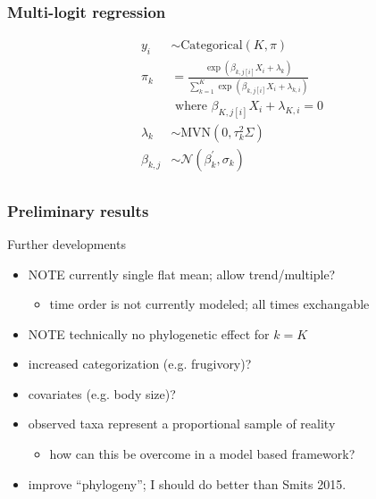 \documentclass{beamer}
\begin{document}
\begin{frame}
  \frametitle{Multi-logit regression}
  \begin{equation*}
    \begin{aligned}
      y_{i} &\sim \mathrm{Categorical}(K, \pi) \\
      \pi_{k} &= \frac{\exp(\beta_{k, j[i]} X_{i} + \lambda_{k})}{\sum_{k = 1}^{K} \exp(\beta_{k, j[i]} X_{i} + \lambda_{k, i})} \\ 
      &\text{ where } \beta_{K, j[i]} X_{i} + \lambda_{K, i} = 0 \\
      \lambda_{k} &\sim \mathrm{MVN}(0, \tau_{k}^{2}\Sigma) \\
      \beta_{k, j} &\sim \mathcal{N}(\beta_{k}^{\prime}, \sigma_{k}) \\
    \end{aligned}
  \end{equation*}
\end{frame}

\begin{frame}
  \frametitle{Preliminary results}
\end{frame}

\begin{frame}
  \begin{block}{Further developments}
    \begin{itemize}
      \item \uppercase{\alert{note}} currently single flat mean; allow trend/multiple?
        \begin{itemize}
          \item time order is not currently modeled; all times exchangable
        \end{itemize}
      \item \uppercase{\alert{note}} technically no phylogenetic effect for \(k = K\)
      \item increased categorization (e.g. frugivory)?
      \item covariates (e.g. body size)?
      \item observed taxa represent a proportional sample of reality
        \begin{itemize}
          \item how can this be overcome in a \alert{model based} framework?
        \end{itemize}
      \item improve ``phylogeny''; I should do better than Smits 2015.
    \end{itemize}
  \end{block}
\end{frame}
\end{document}
